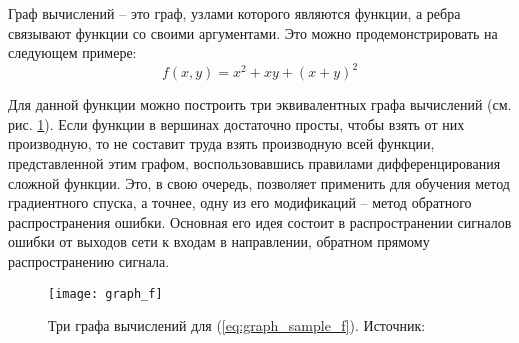 Граф вычислений -- это граф, узлами которого являются функции, а ребра связывают
функции со своими аргументами\cite{deeplearning}. Это можно продемонстрировать
на следующем примере:
\begin{equation}
f(x, y) = x^2 + xy + (x + y)^2
\label{eq:graph_sample_f}
\end{equation}

Для данной функции можно построить три эквивалентных графа вычислений (см.
рис. \ref{fig:graph_for_f}). Если функции в вершинах достаточно просты, чтобы
взять от них производную, то не составит труда взять производную всей функции,
представленной этим графом, воспользовавшись правилами дифференцирования сложной
функции. Это, в свою очередь, позволяет применить для обучения метод градиентного
спуска, а точнее, одну из его модификаций -- метод обратного распространения
ошибки. Основная его идея состоит в распространении сигналов ошибки
от выходов сети к входам в направлении, обратном прямому распространению
сигнала.

\begin{figure}[h]
\centering
\texttt{[image: graph\_f]}
\caption{Три графа вычислений для (\ref{eq:graph_sample_f}). Источник: \cite{deeplearning}}
\label{fig:graph_for_f}
\end{figure}
